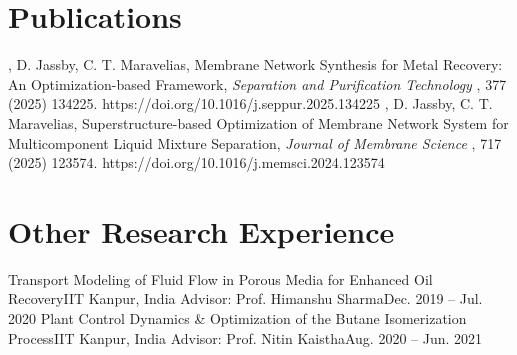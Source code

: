 \documentclass{resume}
\begin{document}
  \resumeSubHeadingListEnd



\section{Publications}
  \resumeSubHeadingListStart
      {, D. Jassby, C. T. Maravelias, Membrane Network Synthesis for Metal Recovery: An Optimization-based Framework,}
      {\textit{Separation and Purification Technology}}
      {, 377 (2025) 134225.}
      {https://doi.org/10.1016/j.seppur.2025.134225}
      {, D. Jassby, C. T. Maravelias, Superstructure-based Optimization of Membrane Network System for Multicomponent Liquid Mixture Separation,}
      {\textit{Journal of Membrane Science}}
      {, 717 (2025) 123574.}
      {https://doi.org/10.1016/j.memsci.2024.123574}
  \resumeSubHeadingListEnd



\section{Other Research Experience}
  \resumeSubHeadingListStart
    \researchHeading
      {Transport Modeling of Fluid Flow in Porous Media for Enhanced Oil Recovery}{IIT Kanpur, India}
      {Advisor: Prof. Himanshu Sharma}{Dec. 2019 -- Jul. 2020}
      \resumeItemListStart
      \resumeItemListEnd
    \researchHeading
      {Plant Control Dynamics \& Optimization of the Butane Isomerization Process}{IIT Kanpur, India}
      {Advisor: Prof. Nitin Kaistha}{Aug. 2020 -- Jun. 2021}
      \resumeItemListStart
      \resumeItemListEnd
  \resumeSubHeadingListEnd
\end{document}
